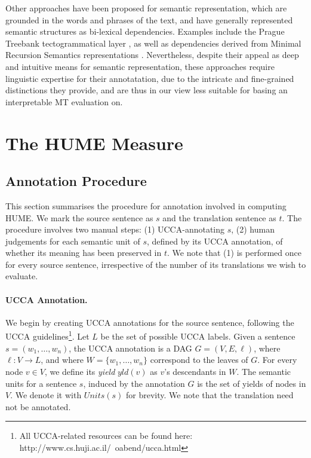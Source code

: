 \documentclass[11pt]{article}
\begin{document}
Other approaches have been proposed for semantic representation, which are grounded in the words
and phrases of the text, and have generally represented semantic structures as bi-lexical dependencies.
Examples include the Prague Treebank tectogrammatical layer \cite{hajic2012announcing}, as well
as dependencies derived from Minimal Recursion Semantics representations \cite{oepen2006discriminant}.
Nevertheless, despite their appeal as deep and intuitive means for semantic representation,
these approaches require linguistic expertise for their annotatation, due to the intricate and
fine-grained distinctions they provide, and are thus in our view less suitable for basing
an interpretable MT evaluation on. 


\section{The HUME Measure}\label{sec:hume}


\subsection{Annotation Procedure}\label{sec:guidelines}

This section summarises the procedure for annotation involved in computing HUME.
We mark the source sentence as $s$ and the translation sentence as $t$. 
The procedure involves two manual steps: (1) UCCA-annotating $s$, 
(2) human judgements for each semantic unit of $s$,
defined by its UCCA annotation, of whether its meaning has been preserved in $t$.
We note that (1) is performed once for every source sentence, irrespective
of the number of its translations we wish to evaluate.

\paragraph{UCCA Annotation.}
We begin by creating UCCA annotations for the source sentence, following the
UCCA guidelines\footnote{All UCCA-related resources can be found
  here: http://www.cs.huji.ac.il/~oabend/ucca.html}.
Let $L$ be the set of possible UCCA labels.
Given a sentence $s = (w_1, \ldots,w_n)$, the UCCA annotation is a DAG $G=(V,E,\ell)$,
where $\ell: V \rightarrow L$, and where $W = \{w_1,\ldots,w_n\}$ correspond to the leaves of $G$.
For every node $v \in V$, we define its {\it yield} $yld(v)$ as $v$'s descendants in $W$.
The semantic units for a sentence $s$, induced by the annotation $G$
is the set of yields of nodes in $V$. We denote it with $Units(s)$ for brevity.
We note that the translation need not be annotated.
\end{document}
